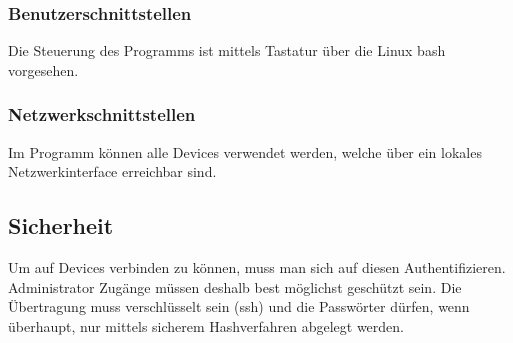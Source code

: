 \documentclass[a4,12pt]{scrartcl}
\begin{document}
\subsubsection{Benutzerschnittstellen}
Die Steuerung des Programms ist mittels Tastatur über die Linux bash vorgesehen.

\subsubsection{Netzwerkschnittstellen}
Im Programm können alle Devices verwendet werden, welche über ein lokales Netzwerkinterface erreichbar sind.

\subsection{Sicherheit}
Um auf Devices verbinden zu können, muss man sich auf diesen Authentifizieren. Administrator Zugänge müssen deshalb best möglichst geschützt sein. Die Übertragung muss verschlüsselt sein (ssh) und die Passwörter dürfen, wenn überhaupt, nur mittels sicherem Hashverfahren abgelegt werden.
\end{document}
